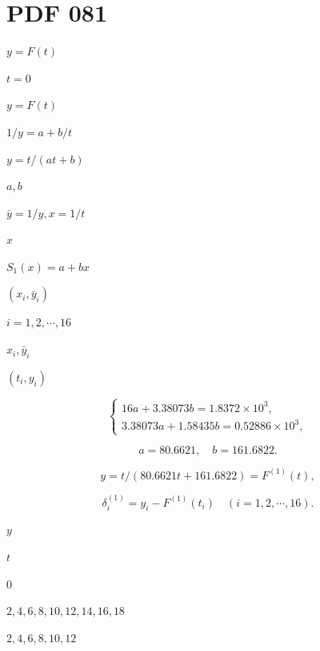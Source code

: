 \documentclass[UTF8,fontset=fandol,a4paper]{ctexart}
\begin{document}
\section*{PDF 081}

\noindent $y=F(t)$\par

\noindent $t=0$\par

\noindent $y=F(t)$\par

\noindent $1/y=a+b/t$\par

\noindent $y=t/(at+b)$\par

\noindent $a,b$\par

\noindent $\bar y=1/y,x=1/t$\par

\noindent $x$\par

\noindent $S_1(x)=a+bx$\par

\noindent $(x_i,\bar y_i)$\par

\noindent $i=1,2,\cdots,16$\par

\noindent $x_i,\bar y_i$\par

\noindent $(t_i,y_i)$\par

\[
\begin{cases}
16a+3.38073b=1.8372\times10^3,\\
3.38073a+1.58435b=0.52886\times10^3,
\end{cases}
\]

\[
a=80.6621,\quad b=161.6822.
\]

\[
y=t/(80.6621t+161.6822)=F^{(1)}(t),
\]

\[
\delta_i^{(1)}=y_i-F^{(1)}(t_i)\quad(i=1,2,\cdots,16).
\]

\noindent $y$\par

\noindent $t$\par

\noindent $0$\par

\noindent $2,4,6,8,10,12,14,16,18$\par

\noindent $2,4,6,8,10,12$\par
\end{document}
